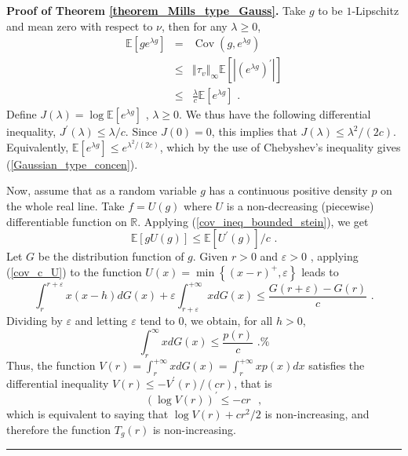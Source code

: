 \documentclass[11pt]{article}
\newenvironment{proof}[1][Proof]{\noindent\textbf{#1.} }{\ \rule{0.5em}{0.5em}}
\DeclareMathOperator{\cov}{Cov}
\begin{document}
\begin{proof}[Proof of Theorem \protect\ref{theorem_Mills_type_Gauss}]
Take $g$ to be $1$-Lipschitz and mean zero with respect to $\nu $, then for
any $\lambda \geq 0$,%
\begin{eqnarray*}
\mathbb{E}\left[ ge^{\lambda g}\right] &=&%
\cov%
\left( g,e^{\lambda g}\right) \\
&\leq &\left\Vert \tau _{v}\right\Vert _{\infty }\mathbb{E}\left[ \left\vert
\left( e^{\lambda g}\right) ^{\prime }\right\vert \right] \\
&\leq &\frac{\lambda }{c}\mathbb{E}\left[ e^{\lambda g}\right] \text{ .}
\end{eqnarray*}%
Define $J\left( \lambda \right) =\log \mathbb{E}\left[ e^{\lambda g}\right] $%
, $\lambda \geq 0$. We thus have the following differential inequality, $%
J^{\prime }\left( \lambda \right) \leq \lambda /c$. Since $J\left( 0\right)
=0$, this implies that $J\left( \lambda \right) \leq \lambda ^{2}/\left(
2c\right) $. Equivalently, $\mathbb{E}\left[ e^{\lambda g}\right] \leq
e^{\lambda ^{2}/\left( 2c\right) }$, which by the use of Chebyshev's
inequality gives (\ref{Gaussian_type_concen}).

Now, assume that as a random variable $g$ has a continuous positive density $%
p$ on the whole real line. Take $f=U\left( g\right) $ where $U$ is a
non-decreasing (piecewise) differentiable function on $\mathbb{R}$. Applying
(\ref{cov_ineq_bounded_stein}), we get%
\begin{equation}
\mathbb{E}\left[ gU\left( g\right) \right] \leq \mathbb{E}\left[ U^{\prime
}\left( g\right) \right] /c\text{ .}  \label{cov_c_U}
\end{equation}%
Let $G$ be the distribution function of $g$. Given $r>0$ and $\varepsilon >0$%
, applying (\ref{cov_c_U}) to the function $U\left( x\right) =\min \left\{
\left( x-r\right) ^{+},\varepsilon \right\} $ leads to%
\begin{equation*}
\int_{r}^{r+\varepsilon }x\left( x-h\right) dG\left( x\right) +\varepsilon
\int_{r+\varepsilon }^{+\infty }xdG\left( x\right) \leq \frac{G\left(
r+\varepsilon \right) -G\left( r\right) }{c}\text{ .}
\end{equation*}%
Dividing by $\varepsilon $ and letting $\varepsilon $ tend to $0$, we
obtain, for all $h>0$,%
\begin{equation*}
\int_{r}^{\infty }xdG\left( x\right) \leq \frac{p\left( r\right) }{c}\text{ .%
}
\end{equation*}%
Thus, the function $V\left( r\right) =\int_{r}^{+\infty }xdG\left( x\right)
=\int_{r}^{+\infty }xp\left( x\right) dx$ satisfies the differential
inequality $V\left( r\right) \leq -V^{\prime }\left( r\right) /(cr)$, that is%
\begin{equation*}
\left( \log V\left( r\right) \right) ^{\prime }\leq -cr\text{ },
\end{equation*}%
which is equivalent to saying that $\log V\left( r\right) +cr^{2}/2$ is
non-increasing, and therefore the function $T_{g}\left( r\right) $ is
non-increasing.
\end{proof}
\end{document}
